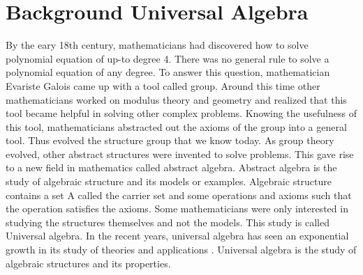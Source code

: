 \chapter{Background Universal Algebra}

By the eary 18th century, mathematicians had discovered how to solve polynomial equation of up-to degree 4. There was no general rule to solve a polynomial equation of any degree. To answer this question, mathematician Evariste Galois came up with a tool called group. Around this time other mathematicians worked on modulus theory and geometry and realized that this tool became helpful in solving other complex problems. \cite{enwiki:1107380309} Knowing the usefulness of this tool, mathematicians abstracted out the axioms of the group into a general tool. Thus evolved the structure group that we know today. As group theory evolved, other abstract structures were invented to solve problems. This gave rise to a new field in mathematics called abstract algebra. Abstract algebra is the study of algebraic structure and its models or examples.  Algebraic structure contains a set A called the carrier set and some operations and axioms such that the operation satisfies the axioms. Some mathematicians were only interested in studying the structures themselves and not the models. This study is called Universal algebra.  In the recent years, universal algebra has seen an exponential growth in its study of theories and applications \cite{sankappanavar1981course}. Universal algebra is the study of algebraic structures and its properties. 

